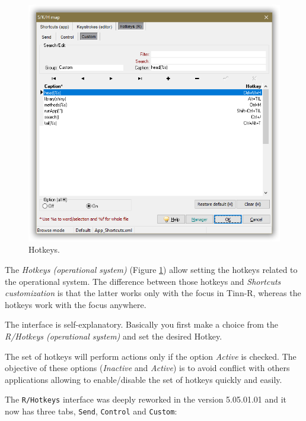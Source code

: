\begin{figure}[H]
  \includegraphics[scale=0.36]{./res/skh_map_rh_custom_dlg.png}
  \caption{Hotkeys.}
  \label{fig:hotkeys}
\end{figure}

The \textit{Hotkeys (operational system)}
(Figure \ref{fig:hotkeys})
allow setting the hotkeys
related to the operational system. The difference between those hotkeys and
\textit{Shortcuts customization} is that the latter works only with the
focus in Tinn-R, whereas the hotkeys work with the focus anywhere.

The interface is self-explanatory. Basically you first make a choice from
the \textit{R/Hotkeys (operational system)} and set the desired Hotkey.

The set of hotkeys will perform actions only if the option \textit{Active}
is checked. The objective of these options (\textit{Inactive} and
\textit{Active}) is to avoid conflict with others applications allowing
to enable/disable the set of hotkeys quickly and easily.

The \texttt{R/Hotkeys} interface was deeply reworked in the version 5.05.01.01 and it now has three tabs,
\texttt{Send}, \texttt{Control} and \texttt{Custom}:

